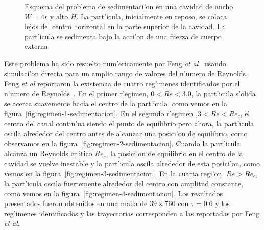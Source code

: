 \begin{figure}
\centering
\vskip 1cm
\caption{\label{fig:scheme-sedimentacion}
Esquema del problema de sedimentaci'on en una cavidad de ancho $W=4r$ y alto $H$. 
La part'icula, inicialmente
en reposo,  se coloca lejos del centro horizontal en la parte superior de la cavidad. La part'icula
se sedimenta bajo la acci'on de una fuerza de cuerpo externa.
}
\end{figure}



Este problema ha sido resuelto num'ericamente por Feng {\it et al}~\cite{feng94} usando simulaci'on
directa para un amplio rango de valores del n'umero de Reynolds. Feng {\it et al} reportaron la existencia de cuatro reg'imenes  
identificados por el n'umero de Reynolds~\cite{feng94}. En el primer r'egimen, $0<Re<3.0$, la
part'icula s'olida se acerca suavemente hacia el centro de la part'icula, como 
vemos en la figura~\ref{fig:regimen-1-sedimentacion}. En el segundo r'egimen ,$3<Re<Re_{c}$, el
centro del canal contin'ua siendo el punto de equilibrio pero ahora, la part'icula
oscila alrededor del centro antes de alcanzar una posici'on de equilibrio, como 
observamos en la figura~\ref{fig:regimen-2-sedimentacion}. Cuando la part'icula alcanza un 
Reynolds cr'itico $Re_c$, la posici'on de equilibrio en el centro de la cavidad se vuelve
inestable y la part'icula oscila alrededor de esta posici'on, como vemos en la 
figura~\ref{fig:regimen-3-sedimentacion}. En la cuarta regi'on, $Re>Re_c$, la part'icula
oscila fuertemente alrededor del centro con amplitud constante, como vemos en
la figura~\ref{fig:regimen-4-sedimentacion}. Los resultados presentados fueron obtenidos en
una malla de $39 \times 760$ con $\tau=0.6$ y los reg'imenes identificados y las trayectorias
corresponden a las reportadas por Feng {\it et al}.

